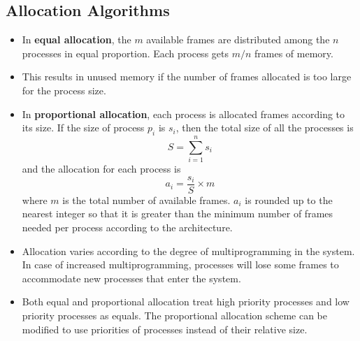 \documentclass{article}
\theoremstyle{plain}
\theoremstyle{definition}
\begin{document}
\subsection{Allocation Algorithms}
\begin{itemize}
    \item In \textbf{equal allocation}, the $m$ available frames are distributed among the $n$ processes in equal proportion. Each process gets $m/n$ frames of memory. 
    
    \item This results in unused memory if the number of frames allocated is too large for the process size.
    
    \item In \textbf{proportional allocation}, each process is allocated frames according to its size. If the size of process $p_i$ is $s_i$, then the total size of all the processes is
    \begin{equation*}
        S = \sum_{i=1}^{n} s_i
    \end{equation*}
    and the allocation for each process is
    \begin{equation*}
        a_i = \frac{s_i}{S} \times m
    \end{equation*}
    where $m$ is the total number of available frames. $a_i$ is rounded up to the nearest integer so that it is greater than the minimum number of frames needed per process according to the architecture. 
    
    \item Allocation varies according to the degree of multiprogramming in the system. In case of increased multiprogramming, processes will lose some frames to accommodate new processes that enter the system. 
    
    \item Both equal and proportional allocation treat high priority processes and low priority processes as equals. The proportional allocation scheme can be modified to use priorities of processes instead of their relative size. 
\end{itemize}
\end{document}
